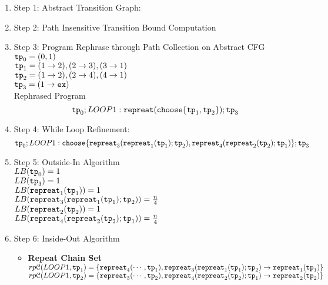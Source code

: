     \begin{enumerate}
      \item Step 1: Abstract Transition Graph:
    
    \item Step 2: Path Insensitive Transition Bound Computation
    
    \item Step 3: Program Rephrase through Path Collection on Abstract CFG
    \\
    $\mathtt{tp}_0 = (0, 1)$
    \\
    $\mathtt{tp}_1 = (1 \to 2), (2 \to 3), (3 \to 1)$
    \\
    $\mathtt{tp}_2 = (1 \to 2), (2 \to 4), (4 \to 1)$
    \\
    $\mathtt{tp}_3 = (1 \to \mathtt{ex})$
    \\
    Rephrased Program
    \[
    \mathtt{tp}_0 ; LOOP1: \mathtt{repreat}(\mathtt{choose}\{\mathtt{tp}_1, \mathtt{tp}_2 \}); \mathtt{tp}_3
    \]
    \item Step 4: While Loop Refinement:
    \[
      \mathtt{tp}_0 ; LOOP1: \mathtt{choose}\{\mathtt{repreat}_3(\mathtt{repreat}_1(\mathtt{tp}_1); \mathtt{tp}_2) , \mathtt{repreat}_4(\mathtt{repreat}_2(\mathtt{tp}_2); \mathtt{tp}_1) \}; \mathtt{tp}_3
      \]
    \item Step 5: Outside-In Algorithm
    \\
    $LB(\mathtt{tp}_0) = 1$
    \\
    $LB(\mathtt{tp}_3) = 1$
    \\
    $LB(\mathtt{repreat}_1(\mathtt{tp}_1)) = 1 $
    \\
    $LB(\mathtt{repreat}_3(\mathtt{repreat}_1(\mathtt{tp}_1); \mathtt{tp}_2)) = \frac{n}{4} $
    \\
    $LB(\mathtt{repreat}_2(\mathtt{tp}_2)) = 1 $
    \\
    $LB(\mathtt{repreat}_4(\mathtt{repreat}_2(\mathtt{tp}_2); \mathtt{tp}_1)) = \frac{n}{4} $
    \item Step 6: Inside-Out Algorithm
    \begin{itemize}
      \item \textbf{Repeat Chain Set}
      \\
      $rp\mathcal{C}(LOOP1, \mathtt{tp}_1) = \{\mathtt{repreat}_4(\cdots, \mathtt{tp}_1), \mathtt{repreat}_3(\mathtt{repreat}_1(\mathtt{tp}_1); \mathtt{tp}_2) \to \mathtt{repreat}_1(\mathtt{tp}_1)\}$ \\
      $rp\mathcal{C}(LOOP1, \mathtt{tp}_2) = \{\mathtt{repreat}_3(\cdots, \mathtt{tp}_2), \mathtt{repreat}_4(\mathtt{repreat}_2(\mathtt{tp}_2); \mathtt{tp}_1) \to \mathtt{repreat}_2(\mathtt{tp}_2)\}$ \\

\end{itemize}
\end{enumerate}
